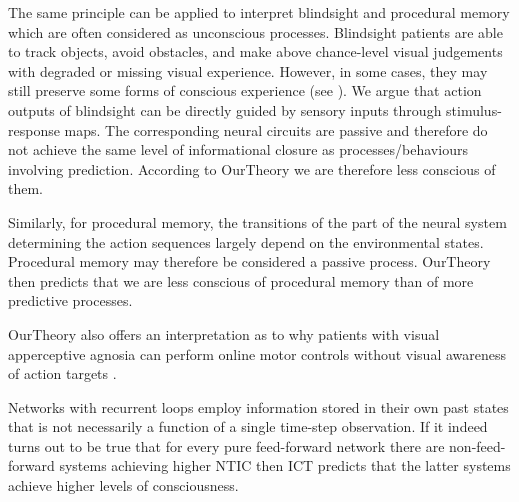 \documentclass[utf8]{article}
\begin{document}
        		The same principle can be applied to interpret blindsight \citep{humphrey1999history, humphrey1974vision, Humphrey1970} and procedural memory \citep{doyon2009contributions, ashby2010cortical} which are often considered as unconscious processes.
        		Blindsight patients are able to track objects, avoid obstacles, and make above chance-level visual judgements with degraded or missing visual experience. However, in some cases, they may still preserve some forms of conscious experience (see \cite{overgaard2011visual, mazzi2016blind}). We argue that action outputs of blindsight can be directly guided by sensory inputs through stimulus-response maps. The corresponding neural circuits are passive and therefore do not achieve the same level of informational closure as processes/behaviours involving prediction. According to \ac{OurTheory} we are therefore less conscious of them. 
        		
        		Similarly, for procedural memory, the transitions of the part of the neural system determining the action sequences largely depend on the  environmental states. Procedural memory may therefore be considered a passive process. \ac{OurTheory} then predicts that we are less conscious of procedural memory than of more predictive processes. 
        		
        		\ac{OurTheory} also offers an interpretation as to why patients with visual apperceptive agnosia \citep{james2003ventral} can perform online motor controls without visual awareness of action targets \citep{10.3389/fneur.2014.00255}. 
                
                
               
                
                Networks with recurrent loops employ information stored in their own past states that is not necessarily a function of a single time-step observation. 
        		If it indeed turns out to be true that for every pure feed-forward network there are non-feed-forward systems achieving higher NTIC then ICT predicts that the latter  systems achieve higher levels of consciousness. 
        		
\end{document}
